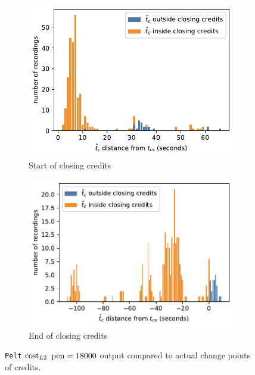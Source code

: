 \begin{figure}[h]
\begin{subfigure}[t]{.49\textwidth}
        \centering
        \includegraphics[width=\linewidth]{../plots/distances/pelt_l2_dist_end_first.pdf}
        \caption{Start of closing credits}
        \label{fig:t_diff_cs}
      \end{subfigure}
      \begin{subfigure}[t]{.49\textwidth}
        \centering
        \includegraphics[width=\linewidth]{../plots/distances/pelt_l2_dist_end_last.pdf}
        \caption{End of closing credits}
        \label{fig:t_diff_ce}
      \end{subfigure}
    \caption{\texttt{Pelt} $\operatorname{cost}_{L2}$ $\operatorname{pen}=18000$ output compared to actual change points of credits.}
    \label{fig:t_diff_credits}
\end{figure}

